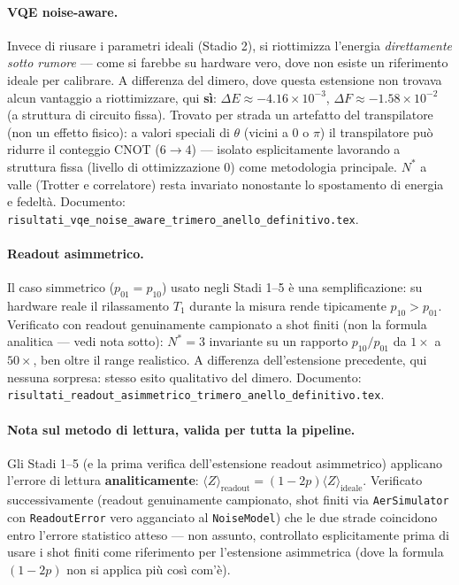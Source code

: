 \documentclass[11pt,a4paper]{article}
\begin{document}
\paragraph{VQE noise-aware.} Invece di riusare i parametri ideali
(Stadio 2), si riottimizza l'energia \emph{direttamente sotto rumore} ---
come si farebbe su hardware vero, dove non esiste un riferimento ideale
per calibrare. A differenza del dimero, dove questa estensione non
trovava alcun vantaggio a riottimizzare, qui \textbf{sì}: $\Delta
E\approx-4.16\times10^{-3}$, $\Delta F\approx-1.58\times10^{-2}$ (a
struttura di circuito fissa). Trovato per strada un artefatto del
transpilatore (non un effetto fisico): a valori speciali di $\theta$
(vicini a $0$ o $\pi$) il transpilatore può ridurre il conteggio CNOT
($6\to4$) --- isolato esplicitamente lavorando a struttura fissa
(livello di ottimizzazione 0) come metodologia principale. $N^*$ a
valle (Trotter e correlatore) resta invariato nonostante lo spostamento
di energia e fedeltà. Documento:
\texttt{risultati\_vqe\_\allowbreak noise\_aware\_\allowbreak trimero\_anello\_definitivo.tex}.

\paragraph{Readout asimmetrico.} Il caso simmetrico ($p_{01}=p_{10}$)
usato negli Stadi 1--5 è una semplificazione: su hardware reale il
rilassamento $T_1$ durante la misura rende tipicamente $p_{10}>p_{01}$.
Verificato con readout genuinamente campionato a shot finiti (non la
formula analitica --- vedi nota sotto): $N^*=3$ invariante su un
rapporto $p_{10}/p_{01}$ da $1\times$ a $50\times$, ben oltre il range
realistico. A differenza dell'estensione precedente, qui nessuna
sorpresa: stesso esito qualitativo del dimero. Documento:
\texttt{risultati\_readout\_\allowbreak asimmetrico\_\allowbreak trimero\_anello\_definitivo.tex}.

\paragraph{Nota sul metodo di lettura, valida per tutta la pipeline.} Gli
Stadi 1--5 (e la prima verifica dell'estensione readout asimmetrico)
applicano l'errore di lettura \textbf{analiticamente}:
$\langle Z\rangle_\text{readout}=(1-2p)\langle Z\rangle_\text{ideale}$.
Verificato successivamente (readout genuinamente campionato, shot
finiti via \texttt{AerSimulator} con \texttt{ReadoutError} vero
agganciato al \texttt{NoiseModel}) che le due strade coincidono entro
l'errore statistico atteso --- non assunto, controllato esplicitamente
prima di usare i shot finiti come riferimento per l'estensione
asimmetrica (dove la formula $(1-2p)$ non si applica più così com'è).
\end{document}
